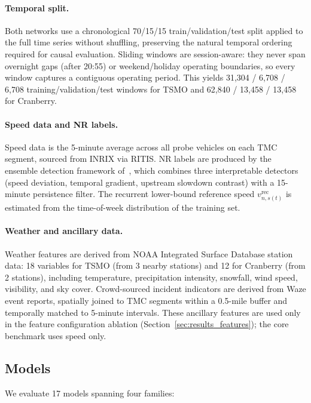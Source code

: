 \documentclass[a4paper]{cas-sc}
\begin{document}
\paragraph{Temporal split.}
Both networks use a chronological 70/15/15 train/validation/test split
applied to the full time series without shuffling, preserving the
natural temporal ordering required for causal evaluation.
Sliding windows are session-aware: they never span overnight gaps
(after 20:55) or weekend/holiday operating boundaries,
so every window captures a contiguous operating period.
This yields 31,304 / 6,708 / 6,708 training/validation/test windows
for TSMO and 62,840 / 13,458 / 13,458 for Cranberry.

\paragraph{Speed data and NR labels.}
Speed data is the 5-minute average across all probe vehicles on each
TMC segment, sourced from INRIX via RITIS.
NR labels are produced by the ensemble detection framework
of~\citet{bae2026labeling}, which combines three interpretable
detectors (speed deviation, temporal gradient, upstream slowdown
contrast) with a 15-minute persistence filter.
The recurrent lower-bound reference speed $v^{\mathrm{rec}}_{n,s(t)}$
is estimated from the time-of-week distribution of the training set.

\paragraph{Weather and ancillary data.}
Weather features are derived from NOAA Integrated Surface Database
station data: 18 variables for TSMO (from 3 nearby stations) and
12 for Cranberry (from 2 stations), including temperature,
precipitation intensity, snowfall, wind speed, visibility, and
sky cover.
Crowd-sourced incident indicators are derived from Waze event
reports, spatially joined to TMC segments within a 0.5-mile
buffer and temporally matched to 5-minute intervals.
These ancillary features are used only in the feature configuration
ablation (Section~\ref{sec:results_features}); the core benchmark
uses speed only.

\subsection{Models}
\label{sec:models}

We evaluate 17 models spanning four families:
\end{document}

